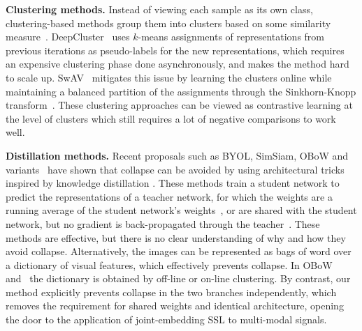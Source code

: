 \documentclass{article}
\begin{document}
\vspace{2mm}
\textbf{Clustering methods.} Instead of viewing each sample as its own class, clustering-based methods group them into clusters based on some similarity measure~\cite{caron2020swav, caron2018clustering, bautista2016cliquecnn, yang2016joint, xie2016clustering, huang2019neighbourhood, zhuang2019local, caron2019noncurated, asano2020labelling, yan2020clusterfit}. DeepCluster~\cite{caron2018clustering} uses $k$-means assignments of representations from previous iterations as pseudo-labels for the new representations, which requires an expensive clustering phase done asynchronously, and makes the method hard to scale up. SwAV~\cite{caron2020swav} mitigates this issue by learning the clusters online while maintaining a balanced partition of the assignments through the Sinkhorn-Knopp transform~\cite{cuturi2013sinkhorn}. These clustering approaches can be viewed as contrastive learning at the level of clusters which still requires a lot of negative comparisons to work well. 

\vspace{2mm}
\noindent \textbf{Distillation methods.} Recent proposals such as BYOL, SimSiam, OBoW and variants~\cite{grill2020byol, chen2020simsiam, gidaris2021obow, richemond2020byolworks, gidaris2020bags} have shown that collapse can be avoided by using architectural tricks inspired by knowledge distillation \cite{hinton2015distillation}. These methods train a student network to predict the representations of a teacher network, for which the weights are a running average of the student network's weights~\cite{grill2020byol}, or are shared with the student network, but no gradient is back-propagated through the teacher~\cite{chen2020simsiam}. These methods are effective, but there is no clear understanding of why and how they avoid collapse. Alternatively, the images can be represented as bags of word over a dictionary of visual features, which effectively prevents collapse. In OBoW~\cite{gidaris2020bags} and~\cite{gidaris2021obow} the dictionary is obtained by off-line or on-line clustering. By contrast, our method explicitly prevents collapse in the two branches independently, which removes the requirement for shared weights and identical architecture, opening the door to the application of joint-embedding SSL to multi-modal signals.
\end{document}
